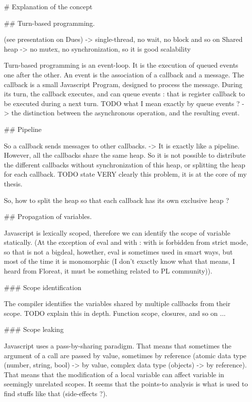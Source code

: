 # Explanation of the concept

## Turn-based programming.







(see presentation on Dues)
-> single-thread, no wait, no block and so on
Shared heap -> no mutex, no synchronization, so it is good scalability


Turn-based programming is an event-loop.
It is the execution of queued events one after the other.
An event is the association of a callback and a message.
The callback is a small Javascript Program, designed to process the message.
During its turn, the callback executes, and can queue events : that is register callback to be executed during a next turn.
TODO what I mean exactly by queue events ? -> the distinction between the asynchronous operation, and the resulting event.

## Pipeline

So a callback sends messages to other callbacks.
-> It is exactly like a pipeline.
However, all the callbacks share the same heap.
So it is not possible to distribute the different callbacks without synchronization of this heap, or splitting the heap for each callback.
TODO state VERY clearly this problem, it is at the core of my thesis.

So, how to split the heap so that each callback has its own exclusive heap ?

## Propagation of variables.

Javascript is lexically scoped, therefore we can identify the scope of variable statically.
(At the exception of eval and with : with is forbidden from strict mode, so that is not a bigdeal, howether, eval is sometimes used in smart ways, but most of the time it is monomorphic (I don't exactly know what that means, I heard from Floreat, it must be something related to PL community)).

### Scope identification

The compiler identifies the variables shared by multiple callbacks from their scope.
TODO explain this in depth.
Function scope, closures, and so on ...

### Scope leaking

Javascript uses a pass-by-sharing paradigm.
That means that sometimes the argument of a call are passed by value, sometimes by reference (atomic data type (number, string, bool) -> by value, complex data type (objects) -> by reference).
That means that the modification of a local variable can affect variable in seemingly unrelated scopes.
It seems that the points-to analysis is what is used to find stuffs like that (side-effects ?).

